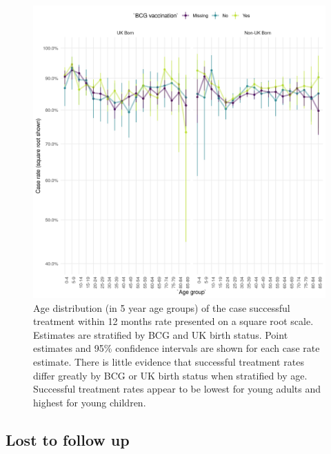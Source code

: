 \documentclass[11pt,twoside]{bristolthesis}
\begin{document}
  \begin{figure}
  
  {\centering \includegraphics[width=0.8\linewidth,]{chapters/tb-epi-england/figures/plot-suc-treat-age-dist} 
  
  }
  
  \caption[Age distribution (in 5 year age groups) of the case successful treatment within 12 months rate presented on a square root scale.]{Age distribution (in 5 year age groups) of the case successful treatment within 12 months rate presented on a square root scale. Estimates are stratified by BCG and UK birth status. Point estimates and 95\%  confidence intervals are shown for each case rate estimate. There is little evidence that successful treatment rates differ greatly by BCG or UK birth status when stratified by age. Successful treatment rates appear to be lowest for young adults and highest for young children.}\label{fig:plot-succ-treat-age-dist}
  \end{figure}
  \hypertarget{lost-to-follow-up}{%
  \subsection{Lost to follow up}\label{lost-to-follow-up}}
  
\end{document}
